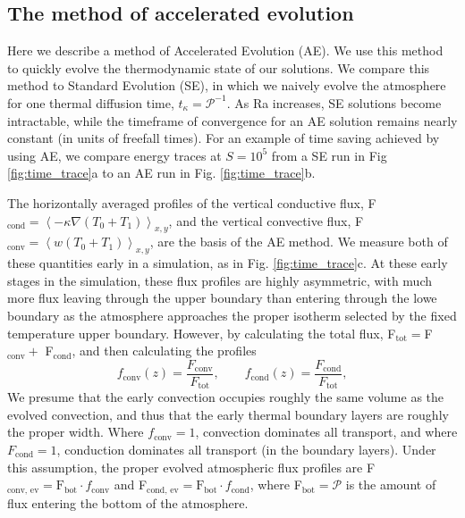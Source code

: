 \documentclass[aps, pre, onecolumn, nofootinbib, notitlepage, groupedaddress, amsfonts, amssymb, amsmath, longbibliography]{revtex4-1}
\newcommand{\angles}[1]{\ensuremath{\left\langle #1 \right\rangle}}
\newcommand{\grad}{\ensuremath{\nabla}}
\begin{document}
\subsection{The method of accelerated evolution}
\label{subsection:ae}
Here we describe a method of Accelerated Evolution (AE). We use this method to quickly evolve the
thermodynamic state of our solutions.  We compare this method to Standard Evolution
(SE), in which we naively evolve the atmosphere for one thermal diffusion time,
$t_\kappa = \mathcal{P}^{-1}$. As Ra increases, SE solutions become intractable, 
while the timeframe of convergence for an AE solution remains nearly constant
(in units of freefall times).
For an example of time saving achieved by using AE, we compare
energy traces at $S = 10^5$ from a SE run in Fig \ref{fig:time_trace}a to an AE run
in Fig. \ref{fig:time_trace}b.

The horizontally averaged profiles of the vertical conductive flux, 
F$_{\text{cond}} = \angles{-\kappa\grad(T_0 + T_1)}_{x,y}$, and the vertical convective flux,
F$_{\text{conv}} = \angles{w(T_0 + T_1)}_{x,y}$, are the basis of the AE method. We measure
both of these quantities early in a simulation, as in Fig. \ref{fig:time_trace}c.
At these early stages in the simulation, these flux profiles are highly asymmetric,
with much more flux leaving through the upper boundary than entering through the
lowe boundary as the atmosphere approaches the proper isotherm selected by the
fixed temperature upper boundary.
However, by calculating the total flux,
F$_{\text{tot}} = $F$_{\text{conv}} +$ F$_{\text{cond}}$, and then calculating the profiles
\begin{equation}
f_{\text{conv}}(z) = \frac{F_{\text{conv}}}{F_{\text{tot}}},\qquad
f_{\text{cond}}(z) = \frac{F_{\text{cond}}}{F_{\text{tot}}},
\label{eqn:bvp_ratios}
\end{equation}
We presume that the early convection occupies roughly the same volume as the evolved
convection, and thus that the early thermal boundary layers are roughly the proper
width.  Where $f_{\text{conv}} = 1$, convection dominates all transport, and where
$F_{\text{cond}} = 1$, conduction dominates all transport (in the boundary
layers). Under this assumption, the proper evolved atmospheric flux profiles
are F$_{\text{conv, ev}} = \text{F}_{\text{bot}}\cdot f_{\text{conv}}$
and F$_{\text{cond, ev}} = \text{F}_{\text{bot}}\cdot f_{\text{cond}}$,
where F$_{\text{bot}} = \mathcal{P}$ is the amount of flux entering the
bottom of the atmosphere.
\end{document}
